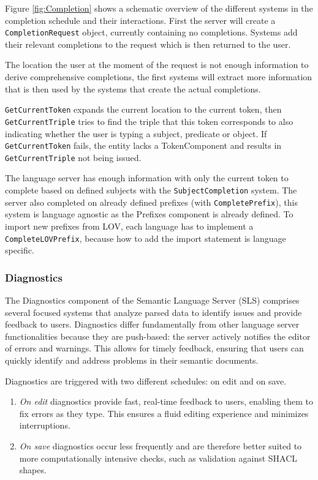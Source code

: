 Figure \ref{fig:Completion} shows a schematic overview of the different systems in the completion schedule and their interactions.
First the server will create a \texttt{CompletionRequest} object, currently containing no completions.
Systems add their relevant completions to the request which is then returned to the user.

The location the user at the moment of the request is not enough information to derive comprehensive completions, 
the first systems will extract more information that is then used by the systems that create the actual completions.

\texttt{GetCurrentToken} expands the current location to the current token, then \texttt{GetCurrentTriple} tries to find the triple that this token corresponds to also indicating whether the user is typing a subject, predicate or object.
If \texttt{GetCurrentToken} fails, the entity lacks a TokenComponent and results in \texttt{GetCurrentTriple} not being issued.

The language server has enough information with only the current token to complete based on defined subjects with the \texttt{SubjectCompletion} system.
The server also completed on already defined prefixes (with \texttt{CompletePrefix}), this system is language agnostic as the Prefixes component is already defined.
To import new prefixes from LOV, each language has to implement a \texttt{CompleteLOVPrefix}, because how to add the import statement is language specific.


\subsubsection{Diagnostics}

The Diagnostics component of the Semantic Language Server (SLS) comprises several focused systems that analyze parsed data to identify issues and provide feedback to users.
Diagnostics differ fundamentally from other language server functionalities because they are push-based: the server actively notifies the editor of errors and warnings.
This allows for timely feedback, ensuring that users can quickly identify and address problems in their semantic documents.

Diagnostics are triggered with two different schedules: on edit and on save.

\begin{enumerate}
  \item \textit{On edit} diagnostics provide fast, real-time feedback to users, enabling them to fix errors as they type. 
    This ensures a fluid editing experience and minimizes interruptions.
  \item \textit{On save} diagnostics occur less frequently and are therefore better suited to more computationally intensive checks,
   such as validation against SHACL shapes.
\end{enumerate}

